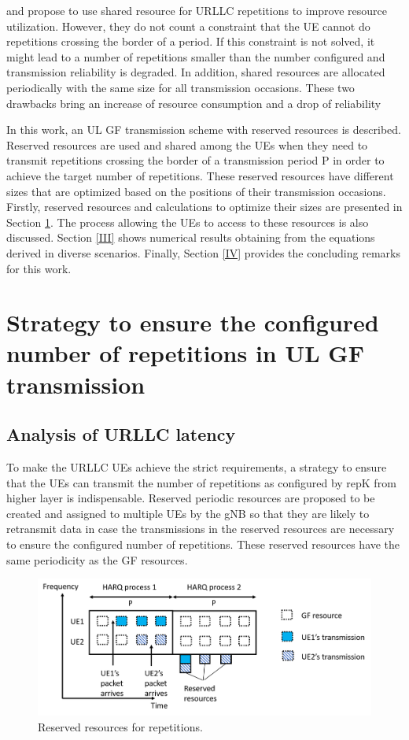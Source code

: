 \documentclass[conference]{IEEEtran}
\begin{document}
\cite{b5} and \cite{b7} propose to use shared resource for URLLC repetitions to improve resource utilization. However, they do not count a constraint that the UE cannot do repetitions crossing the border of a period. If this constraint is not solved, it might lead to a number of repetitions smaller than the  number configured and transmission reliability is degraded. In addition, shared resources are allocated periodically with the same size for all transmission occasions. These two drawbacks bring an increase of resource consumption and a drop of reliability 

In this work, an UL GF transmission scheme with reserved resources is described. Reserved resources are used and shared among the UEs when they need to transmit repetitions crossing the border of a transmission period P in order to achieve the target number of repetitions. These reserved resources have different sizes that are optimized based on the positions of their transmission occasions.  
Firstly, reserved resources and calculations to optimize their sizes are presented in Section \ref{II}. The process allowing the UEs to access to these resources is also discussed. Section \ref{III} shows numerical results obtaining from the equations derived in diverse scenarios. Finally, Section \ref{IV} provides the concluding remarks for this work.

\section{Strategy to ensure the configured number of repetitions in UL GF transmission}\label{II}

\subsection{Analysis of URLLC latency}\label{IIAA}
To make the URLLC UEs achieve the strict requirements, a strategy to ensure that the UEs can transmit the number of repetitions as configured by repK from higher layer is indispensable. Reserved periodic resources are proposed to be created and assigned to multiple UEs by the gNB so that they are likely to retransmit data in case the transmissions in the reserved resources are necessary to ensure the configured number of repetitions. These reserved resources have the same periodicity as the GF resources.

\begin{figure}[htbp]
\centerline{\includegraphics[scale=0.30]{fig2.png}}
\caption{Reserved resources for repetitions.}
\label{fig2}
\end{figure}
\end{document}
